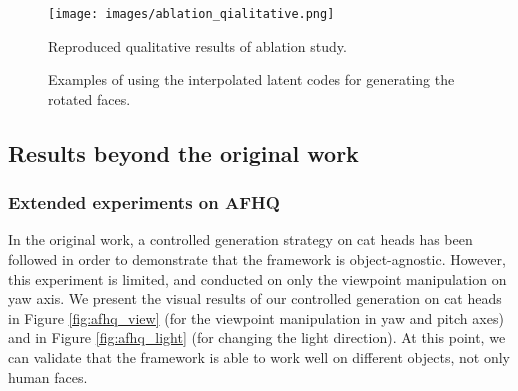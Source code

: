 \begin{figure}[t!]%
    \centering
    {\texttt{[image: images/ablation\_qialitative.png]} }%
    \caption{Reproduced qualitative results of ablation study.}%
    \label{fig:ablation_qual}%
\end{figure}

\begin{figure}[t!]%
    \centering
    \qquad
    \caption{Examples of using the interpolated latent codes for generating the rotated faces.}%
    \label{fig:interpolation}%
\end{figure}

\subsection{Results beyond the original work}

\subsubsection{Extended experiments on AFHQ}

In the original work, a controlled generation strategy on cat heads has been followed in order to demonstrate that the framework is object-agnostic. However, this experiment is limited, and conducted on only the viewpoint manipulation on yaw axis. We present the visual results of our controlled generation on cat heads in Figure \ref{fig:afhq_view} (for the viewpoint manipulation in yaw and pitch axes) and in Figure \ref{fig:afhq_light} (for changing the light direction). At this point, we can validate that the framework is able to work well on different objects, not only human faces.


